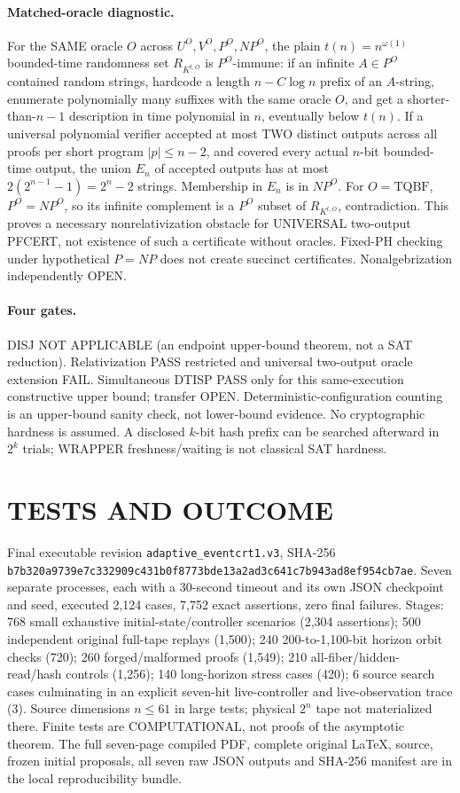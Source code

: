 \documentclass[11pt]{article}
\begin{document}
\paragraph{Matched-oracle diagnostic.} For the SAME oracle $O$ across $U^O,V^O,P^O,NP^O$, the plain $t(n)=n^{\omega(1)}$ bounded-time randomness set $R_{K^{t,O}}$ is $P^O$-immune: if an infinite $A\in P^O$ contained random strings, hardcode a length $n-C\log n$ prefix of an $A$-string, enumerate polynomially many suffixes with the same oracle $O$, and get a shorter-than-$n-1$ description in time polynomial in $n$, eventually below $t(n)$. If a universal polynomial verifier accepted at most TWO distinct outputs across all proofs per short program $|p|\le n-2$, and covered every actual $n$-bit bounded-time output, the union $E_n$ of accepted outputs has at most $2(2^{n-1}-1)=2^n-2$ strings. Membership in $E_n$ is in $NP^O$. For $O=\mathrm{TQBF}$, $P^O=NP^O$, so its infinite complement is a $P^O$ subset of $R_{K^{t,O}}$, contradiction. This proves a necessary nonrelativization obstacle for UNIVERSAL two-output PFCERT, not existence of such a certificate without oracles. Fixed-PH checking under hypothetical $P=NP$ does not create succinct certificates. Nonalgebrization independently OPEN.
\paragraph{Four gates.} DISJ NOT APPLICABLE (an endpoint upper-bound theorem, not a SAT reduction). Relativization PASS restricted and universal two-output oracle extension FAIL. Simultaneous DTISP PASS only for this same-execution constructive upper bound; transfer OPEN. Deterministic-configuration counting is an upper-bound sanity check, not lower-bound evidence. No cryptographic hardness is assumed. A disclosed $k$-bit hash prefix can be searched afterward in $2^k$ trials; WRAPPER freshness/waiting is not classical SAT hardness.
\section{TESTS AND OUTCOME}
Final executable revision \texttt{adaptive\_eventcrt1.v3}, SHA-256 \texttt{b7b320a9739e7c332909c431b0f8773bde13a2ad3c641c7b943ad8ef954cb7ae}. Seven separate processes, each with a 30-second timeout and its own JSON checkpoint and seed, executed 2,124 cases, 7,752 exact assertions, zero final failures. Stages: 768 small exhaustive initial-state/controller scenarios (2,304 assertions); 500 independent original full-tape replays (1,500); 240 200-to-1,100-bit horizon orbit checks (720); 260 forged/malformed proofs (1,549); 210 all-fiber/hidden-read/hash controls (1,256); 140 long-horizon stress cases (420); 6 source search cases culminating in an explicit seven-hit live-controller and live-observation trace (3). Source dimensions $n\le 61$ in large tests; physical $2^n$ tape not materialized there. Finite tests are COMPUTATIONAL, not proofs of the asymptotic theorem. The full seven-page compiled PDF, complete original LaTeX, source, frozen initial proposals, all seven raw JSON outputs and SHA-256 manifest are in the local reproducibility bundle.
\end{document}
